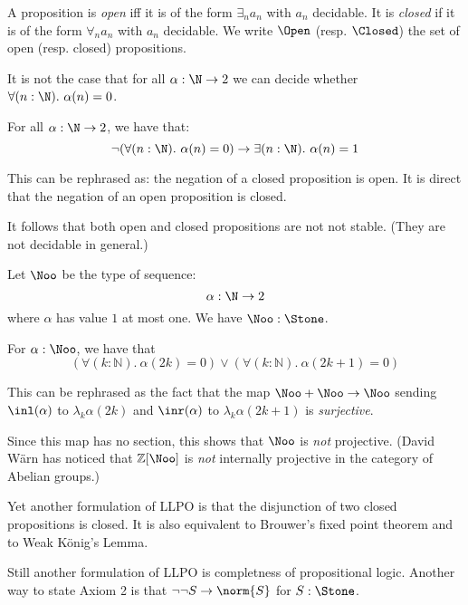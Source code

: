 
A proposition is {\em open} iff it is of the form $\exists_n a_n$ with $a_n$ decidable.
It is {\em closed} if it is of the form $\forall_n a_n$ with $a_n$ decidable.
We write $\Open$ (resp. $\Closed$) the set of open (resp. closed) propositions.


\begin{theorem}
   It is not the case that for all $\alpha:\N\to 2$ we can decide whether $\forall (n:\N).\ \alpha(n)=0$.
\end{theorem}

\begin{theorem}
  For all $\alpha:\N\to 2$, we have that:
   \[\neg(\forall (n:\N).\ \alpha(n)=0) \to \exists (n:\N).\ \alpha(n)=1\]
\end{theorem}

This can be rephrased as: the negation of a closed proposition is open. It is direct that the negation
of an open proposition is closed.

It follows that both open and closed propositions are not not stable. (They are not decidable in general.)

\begin{definition}
Let $\Noo$ be the type of sequence:
\[\alpha:\N\to 2\]
where $\alpha$ has value $1$ at most one. We have $\Noo:\Stone$.
\end{definition}

\begin{theorem}
  For $\alpha:\mathbb \Noo$, 
  we have that 
  \begin{equation}\label{eqnLLPO}
    \left(\forall (k:\mathbb N).\ \alpha(2k) = 0 \right) \vee \left(\forall (k:\mathbb N).\ \alpha(2k+1) = 0\right)
  \end{equation}
\end{theorem}

This can be rephrased as the fact that the map $\Noo+\Noo\rightarrow \Noo$ sending $\inl(\alpha)$ to $\lambda_k \alpha(2k)$
and $\inr(\alpha)$ to $\lambda_k \alpha(2k+1)$ is {\em surjective}.

\medskip

Since this map has no section, this shows that $\Noo$ is {\em not} projective.
(David W\"arn has noticed that $\mathbb{Z}[\Noo]$ is {\em not} internally projective in the category of
Abelian groups.)

\medskip

 Yet another formulation of LLPO is that the disjunction of two closed propositions is closed.
 It is also equivalent to Brouwer's fixed point theorem and to Weak K\"onig's Lemma.

Still another formulation of LLPO is completness of propositional logic. Another way to state
Axiom 2 is that $\neg\neg S\rightarrow \norm{S}$ for $S:\Stone$.


 
